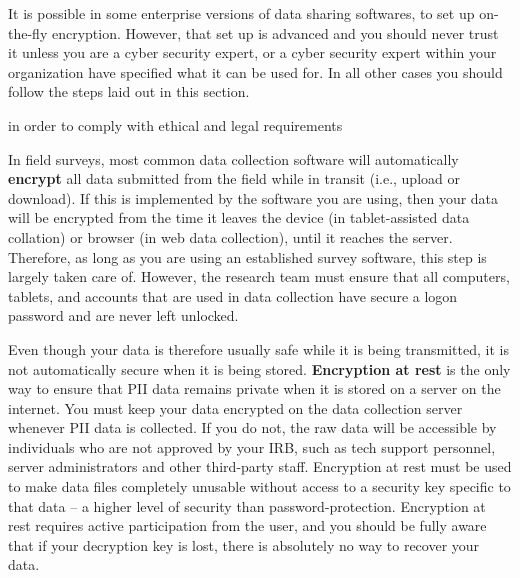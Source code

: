 It is possible in some enterprise versions of data sharing softwares, to set up on-the-fly encryption. 
However, that set up is advanced and you should never trust it unless you are a cyber security expert, 
or a cyber security expert within your organization have specified what it can be used for. In all
other cases you should follow the steps laid out in this section.

in order to comply with ethical and legal requirements

In field surveys, most common data collection software will automatically \textbf{encrypt}
all data submitted from the field while in transit (i.e., upload or download).
If this is implemented by the software you are using, then your
data will be encrypted from the time it leaves the device (in tablet-assisted data 
collation) or browser (in web data collection), until it reaches the server. 
Therefore, as long as you are using an established survey software, this step is 
largely taken care of. However, the research team must ensure that all computers, 
tablets, and accounts that are used in data collection have secure a logon 
password and are never left unlocked.

Even though your data is therefore usually safe while it is being transmitted,
it is not automatically secure when it is being stored.
\textbf{Encryption at rest}
is the only way to ensure that PII data remains private when it is stored on a
server on the internet. You must keep your data encrypted on the data collection server 
whenever PII data is collected. If you do not, the raw data will be accessible by 
individuals who are not approved by your IRB, such as tech support personnel, server 
administrators and other third-party staff. Encryption at rest must be used to make
data files completely unusable without access to a security key specific to that 
data -- a higher level of security than password-protection. Encryption at rest 
requires active participation from the user, and you should be fully aware that 
if your decryption key is lost, there is absolutely no way to recover your data.

